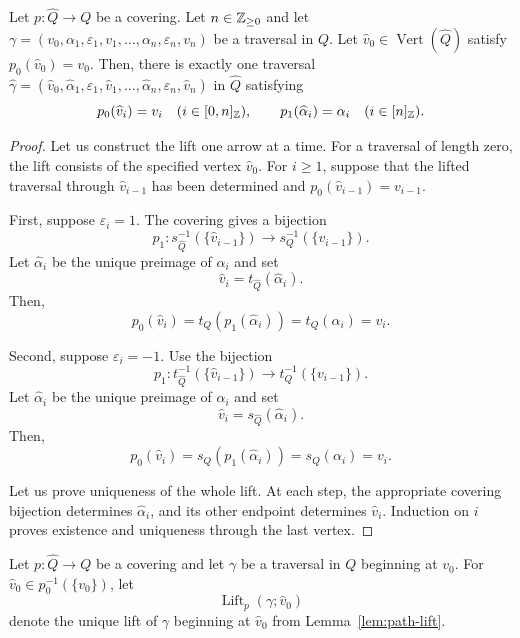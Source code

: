 \begin{lemma}\label{lem:path-lift}
Let $p:\widehat Q\to Q$ be a covering.
Let $n\in\mathbb Z_{\ge0}$ and let
$\gamma=(v_0,\alpha_1,\varepsilon_1,v_1,\ldots,\alpha_n,\varepsilon_n,v_n)$
be a traversal in $Q$.
Let $\widehat v_0\in\operatorname{Vert}(\widehat Q)$ satisfy $p_0(\widehat v_0)=v_0$.
Then, there is exactly one traversal
$\widehat\gamma=(\widehat v_0,\widehat\alpha_1,\varepsilon_1,\widehat v_1,\ldots,\widehat\alpha_n,\varepsilon_n,\widehat v_n)$ in $\widehat Q$ satisfying
\[
 p_0(\widehat v_i)=v_i\quad(i\in[0,n]_{\mathbb Z}),\qquad
 p_1(\widehat\alpha_i)=\alpha_i\quad(i\in[n]_{\mathbb Z}).
\]
\end{lemma}
\begin{proof}
Let us construct the lift one arrow at a time.
For a traversal of length zero, the lift consists of the specified vertex $\widehat v_0$.
For $i\ge1$, suppose that the lifted traversal through $\widehat v_{i-1}$ has been determined and
$p_0(\widehat v_{i-1})=v_{i-1}$.

First, suppose $\varepsilon_i=1$. The covering gives a bijection
\[
 p_1:s_{\widehat Q}^{-1}(\{\widehat v_{i-1}\})
       \longrightarrow s_Q^{-1}(\{v_{i-1}\}).
\]
Let $\widehat\alpha_i$ be the unique preimage of $\alpha_i$ and set
\[
 \widehat v_i=t_{\widehat Q}(\widehat\alpha_i).
\]
Then,
\[
 p_0(\widehat v_i)=t_Q(p_1(\widehat\alpha_i))=t_Q(\alpha_i)=v_i.
\]

Second, suppose $\varepsilon_i=-1$. Use the bijection
\[
 p_1:t_{\widehat Q}^{-1}(\{\widehat v_{i-1}\})
       \longrightarrow t_Q^{-1}(\{v_{i-1}\}).
\]
Let $\widehat\alpha_i$ be the unique preimage of $\alpha_i$ and set
\[
 \widehat v_i=s_{\widehat Q}(\widehat\alpha_i).
\]
Then,
\[
 p_0(\widehat v_i)=s_Q(p_1(\widehat\alpha_i))=s_Q(\alpha_i)=v_i.
\]

Let us prove uniqueness of the whole lift.
At each step, the appropriate covering bijection determines $\widehat\alpha_i$, and its other endpoint determines $\widehat v_i$.
Induction on $i$ proves existence and uniqueness through the last vertex.
\end{proof}

\begin{definition}\label{def:unique-path-lift}
Let $p:\widehat Q\to Q$ be a covering and let $\gamma$ be a traversal in $Q$ beginning at $v_0$.
For $\widehat v_0\in p_0^{-1}(\{v_0\})$, let
\[
 \operatorname{Lift}_p(\gamma;\widehat v_0)
\]
denote the unique lift of $\gamma$ beginning at $\widehat v_0$ from Lemma~\ref{lem:path-lift}.
\end{definition}

